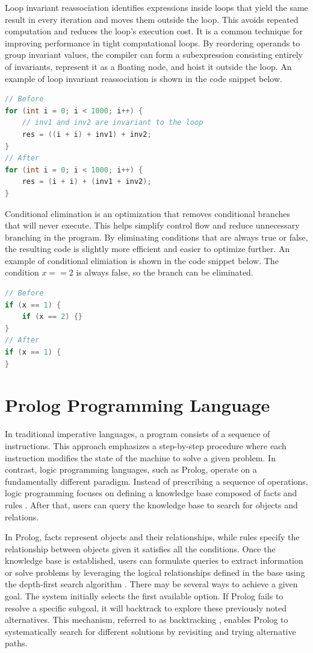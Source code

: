 Loop invariant reassociation identifies expressions inside loops that yield the same result in every iteration and moves them outside the loop. This avoids repeated computation and reduces the loop's execution cost. It is a common technique for improving performance in tight computational loops. By reordering operands to group invariant values, the compiler can form a subexpression consisting entirely of invariants, represent it as a floating node, and hoist it outside the loop. An example of loop invariant reassociation is shown in the code snippet below.

\begin{lstlisting}[language=Java]
// Before
for (int i = 0; i < 1000; i++) {
    // inv1 and inv2 are invariant to the loop
    res = ((i + i) + inv1) + inv2;
}
// After
for (int i = 0; i < 1000; i++) {
    res = (i + i) + (inv1 + inv2);
}
\end{lstlisting}

Conditional elimination is an optimization that removes conditional branches that will never execute. This helps simplify control flow and reduce unnecessary branching in the program. By eliminating conditions that are always true or false, the resulting code is slightly more efficient and easier to optimize further. 
An example of conditional elimiation is shown in the code snippet below. The condition \(x == 2\) is always false, so the branch can be eliminated.
\begin{lstlisting}[language=Java]
// Before
if (x == 1) {
    if (x == 2) {}
}
// After
if (x == 1) {
}
\end{lstlisting}

\section{Prolog Programming Language}

In traditional imperative languages, a program consists of a sequence of instructions.
This approach emphasizes a step-by-step procedure where each instruction modifies the state of the machine to solve a given problem. 
In contrast, logic programming languages, such as Prolog, operate on a fundamentally different paradigm. 
Instead of prescribing a sequence of operations, logic programming focuses on defining a knowledge base composed of facts and rules \cite{Bramer2013}. After that, users can query the knowledge base to search for objects and relations. 

In Prolog, facts represent objects and their relationships, while rules specify the relationship between objects given it satisfies all the conditions. Once the knowledge base is established, users can formulate queries to extract information or solve problems by leveraging the logical relationships defined in the base using the depth-first search algorithm \cite{Chowdhary2020}. There may be several ways to achieve a given goal. The system initially selects the first available option. If Prolog fails to resolve a specific subgoal, it will backtrack to explore these previously noted alternatives. This mechanism, referred to as backtracking \cite{Chowdhary2020}, enables Prolog to systematically search for different solutions by revisiting and trying alternative paths.

